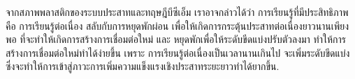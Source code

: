 {\begin{shaded}
		จากสภาพพลาสติกของระบบประสาทและทฤษฎีบีซีเอ็ม
		เราอาจกล่าวได้ว่า การเรียนรู้ที่มีประสิทธิภาพคือ
		การเรียนรู้ต่อเนื่อง สลับกับการหยุดพักผ่อน
		เพื่อให้เกิดการกระตุ้นประสาทต่อเนื่องยาวนานเพียงพอ ที่จะทำให้เกิดการสร้างการเชื่อมต่อใหม่
		และ หยุดพักเพื่อให้ระดับขีดแบ่งปรับตัวลงมา ทำให้การสร้างการเชื่อมต่อใหม่ทำได้ง่ายขึ้น
		เพราะ การเรียนรู้ต่อเนื่องเป็นเวลานานเกินไป จะเพิ่มระดับขีดแบ่งซึ่งจะทำให้การเข้าสู่ภาวะการเพิ่มความแข็งแรงเชิงประสาทระยะยาวทำได้ยากขึ้น.
		\\
		
		
	\vspace{0.5cm}
\begin{Parallel}[c]{0.54\textwidth}{0.45\textwidth}
\end{Parallel}
		
		
		
		
		
		
		
		

\end{shaded}}
